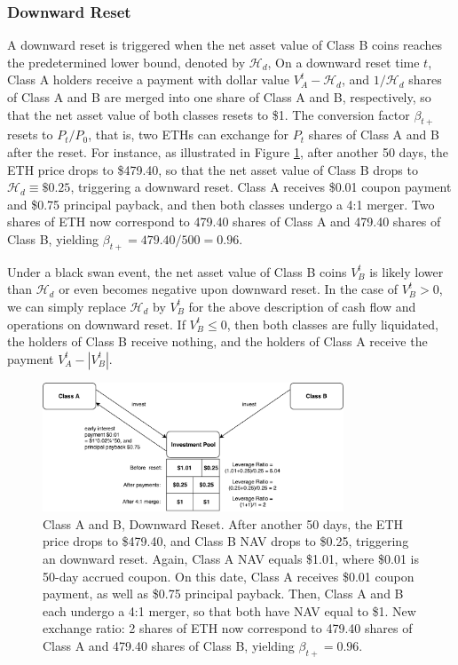 \documentclass[draft, noinfoline]{ectaart}
\numberwithin{equation}{section}
\theoremstyle{plain}
\begin{document}
\subsubsection{Downward Reset}
 A downward reset is triggered when the net asset value of Class B coins reaches the predetermined lower bound, denoted by $\mathcal{H}_{d}$,  On a downward reset time $t$, Class A holders receive a payment with dollar value $V_{A}^{t}-\mathcal{H}_{d}$, and  $1/\mathcal{H}_{d}$ shares of Class A and B are merged into one share of Class A and B, respectively, so that the net asset value of both classes resets to \$1. The conversion factor $\beta_{t+}$ resets to $P_t/P_0$, that is, two ETHs can exchange for $P_t$ shares of Class A and B after the reset. For instance, as illustrated in Figure \ref{fig:downward}, after another 50 days, the ETH price drops to \$479.40, so that the net asset value of Class B drops to $\mathcal{H}_{d}\equiv \$0.25$, triggering a downward reset. Class A receives \$0.01 coupon payment and \$0.75 principal payback, and then both classes undergo a 4:1 merger. Two shares of ETH now correspond to 479.40 shares of Class A and 479.40 shares of Class B, yielding $\beta_{t+}=479.40/500=0.96$.

 Under a black swan event, the net asset value of Class B coins $V_B^t$ is likely lower than $\mathcal{H}_{d}$ or even becomes negative upon downward reset. In the case of $V_B^t>0$, we can simply replace $\mathcal{H}_{d}$ by $V_B^t$ for the above description of cash flow and operations on downward reset. If $V_B^t\leq 0$, then both classes are fully liquidated, the holders of Class B receive nothing, and the holders of Class A receive the payment $V_A^t-|V_{B}^{t}|$.

\begin{figure}[!htb]
	\centering
	\includegraphics[width=0.8\textwidth]{downward}
	\caption{Class A and B, Downward Reset. After another 50 days, the ETH price drops to \$479.40, and Class B NAV drops to \$0.25, triggering an downward reset. Again, Class A NAV equals \$1.01, where \$0.01 is 50-day accrued coupon. On this date, Class A receives \$0.01 coupon payment, as well as \$0.75 principal payback. Then, Class A and B each undergo a 4:1 merger, so that both have NAV equal to \$1. New exchange ratio: 2 shares of ETH now correspond to 479.40 shares of Class A and 479.40 shares of Class B, yielding $\beta_{t+}=0.96$.}\label{fig:downward}
\end{figure}
\end{document}
